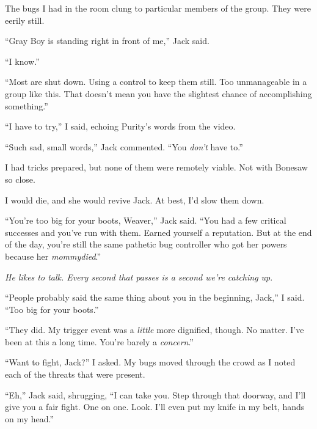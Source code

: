 The bugs I had in the room clung to particular members of the group.  They were eerily still.



``Gray Boy is standing right in front of me,'' Jack said.



``I know.''



``Most are shut down.  Using a control to keep them still.  Too unmanageable in a group like this.  That doesn't mean you have the slightest chance of accomplishing something.''



``I have to try,'' I said, echoing Purity's words from the video.



``Such sad, small words,'' Jack commented.  ``You \emph{don't} have to.''



I had tricks prepared, but none of them were remotely viable.  Not with Bonesaw so close.



I would die, and she would revive Jack.  At best, I'd slow them down.



``You're too big for your boots, Weaver,'' Jack said.  ``You had a few critical successes and you've run with them.  Earned yourself a reputation.  But at the end of the day, you're still the same pathetic bug controller who got her powers because her \emph{mommy}\emph{died}.''



\emph{He likes to talk.  Every second that passes is a second we're catching up}.



``People probably said the same thing about you in the beginning, Jack,'' I said.  ``Too big for your boots.''



``They did.  My trigger event was a \emph{little} more dignified, though.  No matter.  I've been at this a long time.  You're barely a \emph{concern}.''



``Want to fight, Jack?'' I asked.  My bugs moved through the crowd as I noted each of the threats that were present.



``Eh,'' Jack said, shrugging,  ``I can take you.  Step through that doorway, and I'll give you a fair fight.  One on one.  Look.  I'll even put my knife in my belt, hands on my head.''



